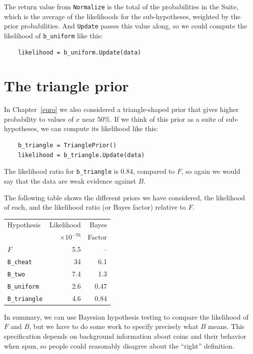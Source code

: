 \documentclass[12pt]{book}
\begin{document}
The return value from {\tt Normalize} is the total of the probabilities
in the Suite, which is the average of the likelihoods for the
sub-hypotheses, weighted by the prior probabilities.  And {\tt Update}
passes this value along, so we could compute the likelihood
of \verb"b_uniform" like this:

\begin{verbatim}
    likelihood = b_uniform.Update(data)
\end{verbatim}



\section{The triangle prior}

In Chapter~\ref{euro} we also considered a triangle-shaped prior that
gives higher probability to values of $x$ near 50\%.  If we think of
this prior as a suite of sub-hypotheses, we can compute its likelihood
like this:

\begin{verbatim}
    b_triangle = TrianglePrior()
    likelihood = b_triangle.Update(data)
\end{verbatim}

The likelihood ratio for \verb"b_triangle" is 0.84, compared to $F$, so
again we would say that the data are weak evidence against $B$.

The following table shows the different priors we have considered, the
likelihood of each, and the likelihood ratio (or Bayes factor)
relative to $F$.

\begin{tabular}{|l|r|r|}
\hline
Hypothesis   & Likelihood & Bayes  \\
             & $\times 10^{-76}$ & Factor  \\
\hline
$F$              & 5.5   & --   \\
\verb"B_cheat"  & 34   &  6.1   \\
\verb"B_two"     & 7.4   &  1.3   \\
\verb"B_uniform"  & 2.6   &  0.47   \\
\verb"B_triangle"  & 4.6   &  0.84   \\
\hline
\end{tabular}


In summary, we can use Bayesian hypothesis testing to compare the
likelihood of $F$ and $B$, but we have to do some work to specify
precisely what $B$ means.  This specification depends on background
information about coins and their behavior when spun, so people
could reasonably disagree about the ``right'' definition.
\end{document}
